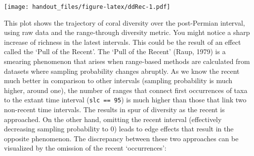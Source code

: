 \documentclass[]{article}
\newenvironment{Shaded}{\begin{snugshade}}{\end{snugshade}}
\newcommand{\CommentTok}[1]{\textcolor[rgb]{0.56,0.35,0.01}{\textit{#1}}}
\newcommand{\DataTypeTok}[1]{\textcolor[rgb]{0.13,0.29,0.53}{#1}}
\newcommand{\DecValTok}[1]{\textcolor[rgb]{0.00,0.00,0.81}{#1}}
\newcommand{\KeywordTok}[1]{\textcolor[rgb]{0.13,0.29,0.53}{\textbf{#1}}}
\newcommand{\NormalTok}[1]{#1}
\newcommand{\OperatorTok}[1]{\textcolor[rgb]{0.81,0.36,0.00}{\textbf{#1}}}
\newcommand{\StringTok}[1]{\textcolor[rgb]{0.31,0.60,0.02}{#1}}
\begin{document}
\begin{Shaded}
\end{Shaded}

\texttt{[image: handout\_files/figure-latex/ddRec-1.pdf]}

This plot shows the trajectory of coral diversity over the post-Permian
interval, using raw data and the range-through diversity metric. You
might notice a sharp increase of richness in the latest intervals. This
could be the result of an effect called the `Pull of the Recent'. The
`Pull of the Recent' (Raup, 1979) is a smearing phenomenon that arises
when range-based methods are calculated from datasets where sampling
probability changes abruptly. As we know the recent much better in
comparison to other intervals (sampling probability is much higher,
around one), the number of ranges that connect first occurrences of taxa
to the extant time interval (\texttt{slc\ ==\ 95}) is much higher than
those that link two non-recent time intervals. The results in spur of
diversity as the recent is approached. On the other hand, omitting the
recent interval (effectively decreasing sampling probability to 0) leads
to edge effects that result in the opposite phenomenon. The discrepancy
between these two approaches can be visualized by the omission of the
recent `occurrences':
\end{document}
